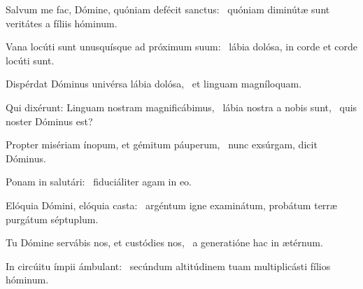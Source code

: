\item Salvum me fac, Dómine, quóniam defécit sanctus:~\psstar{} quóniam diminútæ sunt veritátes a fíliis hóminum.

\item Vana locúti sunt unusquísque ad próximum suum:~\psstar{} lábia dolósa, in corde et corde locúti sunt.

\item Dispérdat Dóminus univérsa lábia dolósa,~\psstar{} et linguam magníloquam.

\item Qui dixérunt: Linguam nostram magnificábimus,~\pscross{} lábia nostra a nobis sunt,~\psstar{} quis noster Dóminus est?

\item Propter misériam ínopum, et gémitum páuperum,~\psstar{} nunc exsúrgam, dicit Dóminus.

\item Ponam in salutári:~\psstar{} fiduciáliter agam in eo.

\item Elóquia Dómini, elóquia casta:~\psstar{} argéntum igne examinátum, probátum terræ purgátum séptuplum.

\item Tu Dómine servábis nos, et custódies nos,~\psstar{} a generatióne hac in ætérnum.

\item In circúitu ímpii ámbulant:~\psstar{} secúndum altitúdinem tuam multiplicásti fílios hóminum.